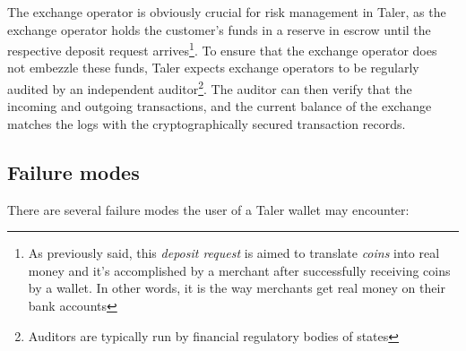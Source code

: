 \documentclass{IEEEtran}
\begin{document}
The exchange operator is obviously crucial for risk management in
Taler, as the exchange operator holds the customer's funds in a
reserve in escrow until the respective deposit request arrives\footnote{As
previously said, this {\it deposit request} is aimed to translate {\it coins}
into real money and it's accomplished by a merchant after successfully
receiving coins by a wallet. In other words, it is the way merchants get
real money on their bank accounts}. To ensure that the exchange operator
does not embezzle these funds, Taler expects exchange operators to be
regularly audited by an independent auditor\footnote{Auditors are typically
run by financial regulatory bodies of states}.  The auditor can then verify that the incoming and outgoing
transactions, and the current balance of the exchange matches the logs
with the cryptographically secured transaction records.


\subsection{Failure modes}

There are several failure modes the user of a Taler wallet may
encounter:
\end{document}

